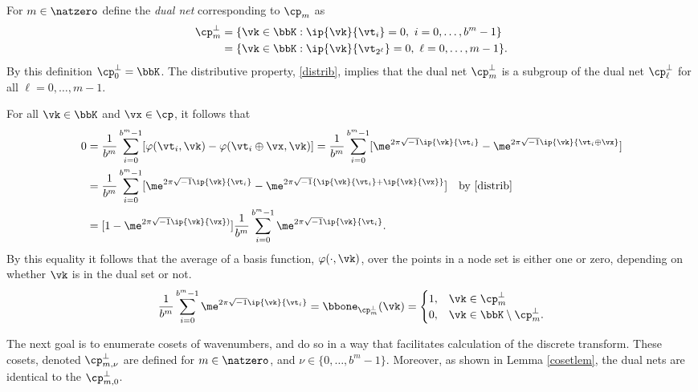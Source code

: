 \documentclass[]{elsarticle}
\theoremstyle{definition}
\begin{document}
For $m \in \natzero$ define the \emph{dual net} corresponding to $\cp_m$ as  
\begin{align*}
\cp^{\perp}_m &= \{\vk \in \bbK : \ip{\vk}{\vt_i} = 0, \ i=0, \ldots, b^m-1\} \\
&= \{\vk \in \bbK : \ip{\vk}{\vt_{2^{\ell}}} = 0, \ \ell=0, \ldots, m-1\}.
\end{align*}
By this definition $\cp^{\perp}_{0}=\bbK$.  The distributive property, \eqref{distrib}, implies that the dual net $\cp^{\perp}_m$ is a subgroup of the dual net $\cp^{\perp}_\ell$ for all $\ell=0, \ldots, m-1$.  

For all $\vk \in \bbK$ and $\vx \in \cp$, it follows that
\begin{align*} 
\nonumber
0 & = \frac{1}{b^m} \sum_{i=0}^{b^m-1} [\varphi(\vt_i,\vk) - \varphi(\vt_i \oplus \vx,\vk)]  
= \frac{1}{b^m} \sum_{i=0}^{b^m-1} [\me^{2 \pi \sqrt{-1} \ip{\vk}{\vt_i}} - \me^{2 \pi \sqrt{-1} \ip{\vk}{\vt_i \oplus \vx}}]\\
\nonumber
& = \frac{1}{b^m} \sum_{i=0}^{b^m-1} [\me^{2 \pi \sqrt{-1} \ip{\vk}{\vt_i}} - \me^{2 \pi \sqrt{-1} \{\ip{\vk}{\vt_i}+\ip{\vk}{\vx}\}}] \quad \text{by } \eqref{distrib}\\
\label{sumeq}
& = [1 - \me^{2 \pi \sqrt{-1} \ip{\vk}{\vx})}] \frac{1}{b^m} \sum_{i=0}^{b^m-1}  \me^{2 \pi \sqrt{-1} \ip{\vk}{\vt_i}}.
\end{align*}
By this equality it follows that the average of a basis function, $\varphi(\cdot,\vk)$, over the points in a node set is either one or zero, depending on whether $\vk$ is in the dual set or not.
\begin{equation*}
\frac{1}{b^m} \sum_{i=0}^{b^m-1}  \me^{2 \pi \sqrt{-1} \ip{\vk}{\vt_i}} = \bbone_{\cp_m^{\perp}}(\vk) = \begin{cases} 1 , & \vk \in \cp_m^{\perp}\\
 0,  & \vk \in \bbK \setminus \cp_m^{\perp}.
 \end{cases}
\end{equation*}

The next goal is to enumerate cosets of wavenumbers, and do so in a way that facilitates calculation of the discrete transform.  These cosets, denoted $\cp_{m,\nu}^{\perp}$ are defined for $m\in \natzero$, and $\nu \in \{0, \ldots, b^m-1\}$.  Moreover, as shown in Lemma \ref{cosetlem}, the dual nets are identical to the $\cp_{m,0}^{\perp}$.
\end{document}
